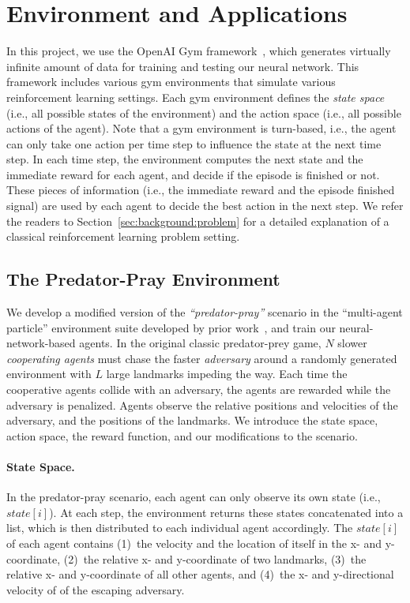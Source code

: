 
\section{Environment and Applications}
\label{sec:application}

In this project, we use the OpenAI Gym framework~\cite{gym.openai16}, which
generates virtually infinite amount of data for training and testing our
neural network. This framework includes various gym environments that simulate
various reinforcement learning settings. Each gym environment defines the
\emph{state space} (i.e., all possible states of the environment) and the
action space (i.e., all possible actions of the agent). Note that a gym
environment is turn-based, i.e., the agent can only take one action per time
step to influence the state at the next time step. In each time step, the
environment computes the next state and the immediate reward for each agent,
and decide if the episode is finished or not. These pieces of information
(i.e., the immediate reward and the episode finished signal) are used by each
agent to decide the best action in the next step. We refer the readers to
Section~\ref{sec:background:problem} for a detailed explanation of a classical
reinforcement learning problem setting.

\subsection{The Predator-Pray Environment}

We develop a modified version of the \emph{``predator-pray''} scenario
in the ``multi-agent particle'' environment suite developed by prior
work~\cite{lowe2017multi, mordatch2017emergence}, and train our
neural-network-based agents. In the original classic predator-prey game, $N$
slower \emph{cooperating agents} must chase the faster \emph{adversary}
around a randomly
generated environment with $L$ large landmarks impeding the way. Each time the
cooperative agents collide with an adversary, the agents are rewarded
while the adversary is penalized. Agents observe the relative positions and
velocities of the adversary, and the positions of the landmarks. We introduce
the state space, action space, the reward function, and our modifications to
the scenario.

\paragraph{State Space.} In the predator-pray scenario, each agent can only
observe its own state (i.e., $state[i]$). At each step, the environment
returns these states concatenated into a list, which is then distributed to
each individual agent accordingly. The $state[i]$ of each agent contains 
(1)~the velocity and the location of itself in the x- and y-coordinate,
(2)~the relative x- and y-coordinate of two landmarks,
(3)~the relative x- and y-coordinate of all other agents, and
(4)~the x- and y-directional velocity of of the escaping adversary.

